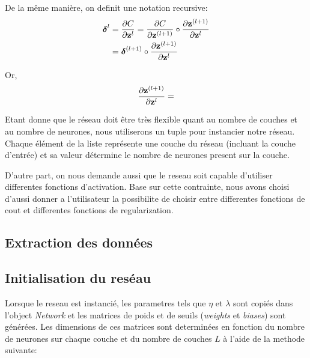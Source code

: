 \documentclass[11pt]{article}
\begin{document}
De la m\^eme mani\`ere, on definit une notation recursive:
\begin{equation}
	\begin{aligned}
		{\boldsymbol \delta}^l &= \frac{\partial C}{\partial {\bf z}^l} =
		\frac{\partial C}{\partial {\bf z}^{(l+1)}} \circ
		\frac{\partial {\bf z}^{(l+1)}}{\partial {\bf z}^l} \\
		&= \boldsymbol \delta^{(l+1)} \circ \frac{\partial {\bf z}^{(l+1)}}{\partial {\bf z}^l} \\
	\end{aligned}
\end{equation}

Or,
\begin{equation}
	\begin{aligned}
		\frac{\partial {\bf z}^{(l+1)}}{\partial {\bf z}^l} &= \\
	\end{aligned}
\end{equation}

Etant donne que le r\'eseau doit \^etre tr\`es flexible quant au nombre de
couches et au nombre de neurones, nous utiliserons un tuple pour instancier
notre r\'eseau.
Chaque \'el\'ement de la liste repr\'esente une couche du r\'eseau
(incluant la couche d'entr\'ee) et sa valeur d\'etermine le nombre de neurones
present sur la couche.

D'autre part, on nous demande aussi que le reseau soit capable d'utiliser
differentes fonctions d'activation. Base sur cette contrainte, nous avons
choisi d'aussi donner a l'utilisateur la possibilite de choisir entre differentes
fonctions de cout et differentes fonctions de regularization.

\subsection{Extraction des donn\'ees}


\subsection{Initialisation du res\'eau}
Lorsque le reseau est instanci\'e, les parametres tels que $\eta$ et $\lambda$
sont copi\'es dans l'object
\emph{Network} et les matrices de poids et de seuils (\emph{weights} et
\emph{biases}) sont g\'en\'er\'ees. Les dimensions de ces matrices sont
determin\'ees en fonction du nombre de neurones sur chaque couche et du nombre
de couches $L$ \`a l'aide de la methode suivante:
\end{document}
